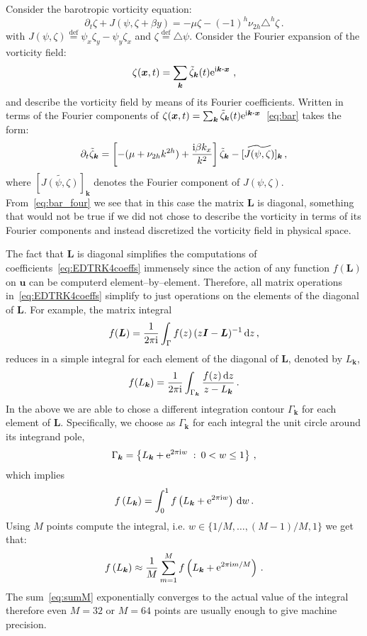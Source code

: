 \documentclass[11pt]{article}
\newcommand{\defn}{\ensuremath{\stackrel{\mathrm{def}}{=}}}
\def\beq{\begin{equation}}
\def\eeq{\end{equation}}
\newcommand{\bx}{\boldsymbol{x}}
\newcommand{\bu}{\boldsymbol{u}}
\newcommand{\bk}{\boldsymbol{k}}
\newcommand{\bL}{\ensuremath {\boldsymbol {L}}}
\newcommand{\bI}{\ensuremath {\boldsymbol {I}}}
\providecommand\bcdot{\boldsymbol{\cdot}}
\def\ii{{\rm i}}
\def\dd{{\rm d}}
\def\ee{{\rm e}}
\newcommand{\lap}{\ensuremath{\triangle}}
\newcommand{\com}{\, ,}
\newcommand{\per}{\, .}
\newcommand{\z}{\zeta}
\renewcommand{\(}{\left(}
\renewcommand{\[}{\left[}
\renewcommand{\)}{\right)}
\renewcommand{\]}{\right]}
\newcommand{\<}{\left\langle}
\renewcommand{\>}{\right\rangle}
\begin{document}
Consider the barotropic vorticity equation:
\beq
\partial_t \z + J(\psi,\z+\beta y) = -\mu \z - (-1)^h \nu_{2h} \lap^{h}\z\per\label{eq:bar}
\eeq
with $J(\psi,\z)\defn \psi_x\z_y-\psi_y\z_x$ and $\z\defn\lap\psi$. Consider the Fourier expansion of the vorticity field:
\beq
\z(\bx,t)=\sum_{\bk}\tilde{\z}_{\bk}(t)\ee^{\ii\bk\bcdot\bx}\ ,
\eeq
and describe the vorticity field by means of its Fourier coefficients. Written in terms of the Fourier components of $\z(\bx,t)=\sum_{\bk}\tilde{\z}_{\bk}(t)\ee^{\ii\bk\bcdot\bx}$~\eqref{eq:bar} takes the form:
\beq
\partial_t \tilde{\z}_{\bk} =\[ - (\mu+\nu_{2h} k^{2h}) + \frac{\ii\beta k_x}{k^2}\]\tilde{\z}_{\bk}  - [\widetilde{J(\psi,\z)}]_{\bk}\com\label{eq:bar_four}
\eeq
where $ [\widetilde{J(\psi,\z)}]_{\bk}$ denotes the Fourier component of $J(\psi,\z)$. From~\eqref{eq:bar_four} we see that in this case the matrix $\bL$ is diagonal, something that would not be true if we did not chose to describe the vorticity in terms of its Fourier components and instead discretized the vorticity field in physical space.

The fact that $\bL$ is diagonal simplifies the computations of coefficients~\eqref{eq:EDTRK4coeffs} immensely since the action of any function $f(\bL)$ on $\bu$ can be computerd element--by--element. Therefore, all matrix operations in~\eqref{eq:EDTRK4coeffs} simplify to just operations on the elements of the diagonal of $\bL$. For example, the matrix integral
\beq
f(\bL) =\frac1{2\pi \ii} \int_{\Gamma} f(z)\,(z\bI-\bL)^{-1}\,\dd z\com
\eeq
reduces in a simple integral for each element of the diagonal of $\bL$, denoted by $L_{\bk}$,
\beq
f(L_{\bk}) =\frac1{2\pi \ii} \int_{\Gamma_{\bk}} \frac{f(z)\,\dd z}{z-L_{\bk}}\per
\eeq
In the above we are able to chose a different integration contour $\Gamma_{\bk}$ for each element of $\bL$. Specifically, we choose as $\Gamma_{\bk}$ for each integral the unit circle around its integrand pole,
\beq
\Gamma_{\bk} =\left\{ L_{\bk}+\ee^{2\pi\ii w}\;:\:0<w\le 1  \right\}\com
\eeq
which implies
\beq
f\(L_{\bk}\) = \int_0^{1} f\(L_{\bk}+\ee^{2\pi\ii w}\)\,\dd w \per
\eeq
Using $M$ points compute the integral, i.e. $w\in\{1/M,\dots,(M-1)/M,1\}$ we get that:
\beq
f\(L_{\bk}\) \approx \frac1{M}\sum_{m=1}^M f\(L_{\bk}+\ee^{2\pi\ii m/M}\) \per\label{eq:sumM}
\eeq
The sum~\eqref{eq:sumM} exponentially converges to the actual value of the integral therefore even $M=32$ or $M=64$ points are usually enough to give machine precision.




\end{document}

